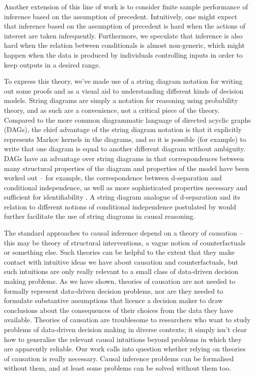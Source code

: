 Another extension of this line of work is to consider finite sample performance of inference based on the assumption of precedent. Intuitively, one might expect that inference based on the assumption of precedent is hard when the actions of interest are taken infrequently. Furthermore, we speculate that inference is also hard when the relation between conditionals is almost non-generic, which might happen when the data is produced by individuals controlling inputs in order to keep outputs in a desired range.

To express this theory, we've made use of a string diagram notation for writing out some proofs and as a visual aid to understanding different kinds of decision models. String diagrams are simply a notation for reasoning using probability theory, and as such are a convenience, not a critical piece of the theory. Compared to the more common diagrammatic language of directed acyclic graphs (DAGs), the chief advantage of the string diagram notation is that it explicitly represents Markov kernels in the diagrams, and so it is possible (for example) to write that one diagram is equal to another different diagram without ambiguity. DAGs have an advantage over string diagrams in that correspondences between many structural properties of the diagram and properties of the model have been worked out -- for example, the correspondence between d-separation and conditional independence, as well as more sophisticated properties necessary and sufficient for identifiability \citep{tian2002general,shpitser_complete_2008}. A string diagram analogue of d-separation and its relation to different notions of conditional independence postulated by \citet{fritz_synthetic_2020} would further facilitate the use of string diagrams in causal reasoning.

The standard approaches to causal inference depend on a theory of causation -- this may be theory of structural interventions, a vague notion of counterfactuals or something else. Such theories can be helpful to the extent that they make contact with intuitive ideas we have about causation and counterfactuals, but such intuitions are only really relevant to a small class of data-driven decision making problems. As we have shown, theories of causation are not needed to formally represent data-driven decision problems, nor are they needed to formulate substantive assumptions that licence a decision maker to draw conclusions about the consequences of their choices from the data they have available. Theories of causation are troublesome to researchers who want to study problems of data-driven decision making in diverse contexts; it simply isn't clear how to generalise the relevant causal intuitions beyond problems in which they are apparently reliable. Our work calls into question whether relying on theories of causation is really necessary. Causal inference problems can be formalised without them, and at least some problems can be solved without them too.